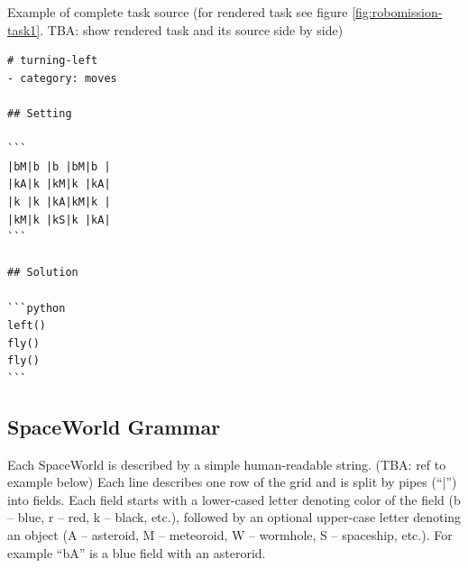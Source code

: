 Example of complete task source (for rendered task see figure \ref{fig:robomission-task1}. TBA: show rendered task and its source side by side)

\begin{lstlisting}
# turning-left
- category: moves

## Setting

```
|bM|b |b |bM|b |
|kA|k |kM|k |kA|
|k |k |kA|kM|k |
|kM|k |kS|k |kA|
```

## Solution

```python
left()
fly()
fly()
```
\end{lstlisting}


\subsection{SpaceWorld Grammar}

Each SpaceWorld is described by a simple human-readable string. (TBA: ref to example below)
Each line describes one row of the grid
and is split by pipes (``|'') into fields.
Each field starts with a lower-cased letter denoting color of the field
(b -- blue, r -- red, k -- black, etc.),
followed by an optional upper-case letter denoting an object
(A -- asteroid, M -- meteoroid, W -- wormhole, S -- spaceship, etc.).
For example ``bA'' is a blue field with an asterorid.


